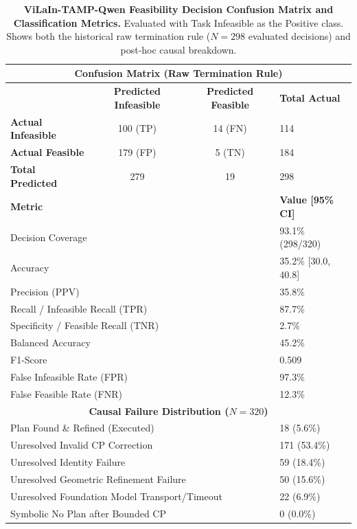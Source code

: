 \begin{table}[t]
\centering
\small
\caption{\textbf{ViLaIn-TAMP-Qwen Feasibility Decision Confusion Matrix and Classification Metrics.}
Evaluated with Task Infeasible as the Positive class. Shows both the historical raw termination rule ($N=298$ evaluated decisions) and post-hoc causal breakdown.}
\label{tab:vilain_qwen_feasibility}
\begin{tabular}{l|cc|l}
\hline
\multicolumn{4}{c}{\textbf{Confusion Matrix (Raw Termination Rule)}} \\
\hline
& \textbf{Predicted Infeasible} & \textbf{Predicted Feasible} & \textbf{Total Actual} \\
\hline
\textbf{Actual Infeasible} & 100 (TP) & 14 (FN) & 114 \\
\textbf{Actual Feasible}   & 179 (FP) & 5 (TN) & 184 \\
\hline
\textbf{Total Predicted}   & 279 & 19 & 298 \\
\hline
\hline
\multicolumn{3}{l|}{\textbf{Metric}} & \textbf{Value [95\% CI]} \\
\hline
\multicolumn{3}{l|}{Decision Coverage} & 93.1\% (298/320) \\
\multicolumn{3}{l|}{Accuracy} & 35.2\% [30.0, 40.8] \\
\multicolumn{3}{l|}{Precision (PPV)} & 35.8\% \\
\multicolumn{3}{l|}{Recall / Infeasible Recall (TPR)} & 87.7\% \\
\multicolumn{3}{l|}{Specificity / Feasible Recall (TNR)} & 2.7\% \\
\multicolumn{3}{l|}{Balanced Accuracy} & 45.2\% \\
\multicolumn{3}{l|}{F1-Score} & 0.509 \\
\multicolumn{3}{l|}{False Infeasible Rate (FPR)} & 97.3\% \\
\multicolumn{3}{l|}{False Feasible Rate (FNR)} & 12.3\% \\
\hline
\hline
\multicolumn{4}{c}{\textbf{Causal Failure Distribution ($N=320$)}} \\
\hline
\multicolumn{3}{l|}{Plan Found \& Refined (Executed)} & 18 (5.6\%) \\
\multicolumn{3}{l|}{Unresolved Invalid CP Correction} & 171 (53.4\%) \\
\multicolumn{3}{l|}{Unresolved Identity Failure} & 59 (18.4\%) \\
\multicolumn{3}{l|}{Unresolved Geometric Refinement Failure} & 50 (15.6\%) \\
\multicolumn{3}{l|}{Unresolved Foundation Model Transport/Timeout} & 22 (6.9\%) \\
\multicolumn{3}{l|}{Symbolic No Plan after Bounded CP} & 0 (0.0\%) \\
\hline
\end{tabular}
\end{table}
